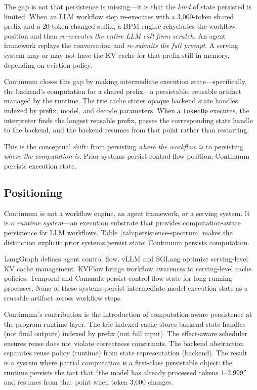 \documentclass[10pt,twocolumn]{article}
\begin{document}
The gap is not that persistence is missing---it is that the \emph{kind} of state persisted is limited. When an LLM workflow step re-executes with a 3,000-token shared prefix and a 20-token changed suffix, a BPM engine rehydrates the workflow position and then \emph{re-executes the entire LLM call from scratch}. An agent framework replays the conversation and \emph{re-submits the full prompt}. A serving system may or may not have the KV cache for that prefix still in memory, depending on eviction policy.

Continuum closes this gap by making intermediate execution state---specifically, the backend's computation for a shared prefix---a persistable, reusable artifact managed by the runtime. The trie cache stores opaque backend state handles indexed by prefix, model, and decode parameters. When a \texttt{TokenOp} executes, the interpreter finds the longest reusable prefix, passes the corresponding state handle to the backend, and the backend resumes from that point rather than restarting.

This is the conceptual shift: from persisting \emph{where the workflow is} to persisting \emph{where the computation is}. Prior systems persist control-flow position; Continuum persists execution state.

\subsection{Positioning}

Continuum is not a workflow engine, an agent framework, or a serving system. It is a \emph{runtime system}---an execution substrate that provides computation-aware persistence for LLM workflows. Table~\ref{tab:persistence-spectrum} makes the distinction explicit: prior systems persist state; Continuum persists computation.

LangGraph \cite{langgraph2024docs} defines agent control flow. vLLM \cite{kwon2023pagedattention} and SGLang \cite{zheng2024sglang} optimize serving-level KV cache management. KVFlow \cite{pan2025kvflow} brings workflow awareness to serving-level cache policies. Temporal \cite{temporal2024docs} and Camunda \cite{camunda2024docs} persist control-flow state for long-running processes. None of these systems persist intermediate model execution state as a reusable artifact across workflow steps.

Continuum's contribution is the introduction of computation-aware persistence at the program runtime layer. The trie-indexed cache stores backend state handles (not final outputs) indexed by prefix (not full input). The effect-aware scheduler ensures reuse does not violate correctness constraints. The backend abstraction separates reuse policy (runtime) from state representation (backend). The result is a system where partial computation is a first-class persistable object: the runtime persists the fact that ``the model has already processed tokens 1--2,999'' and resumes from that point when token 3,000 changes.
\end{document}
